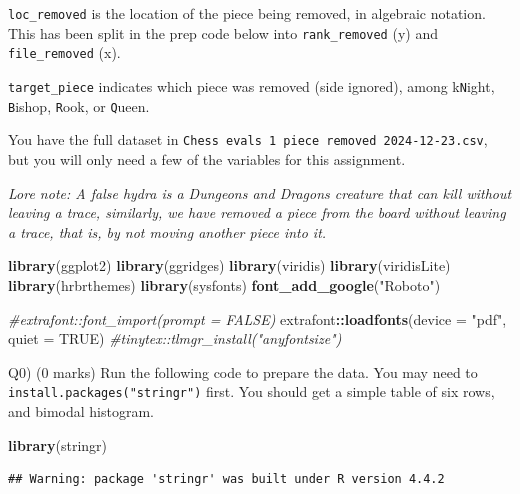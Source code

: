 \documentclass[
]{article}
\newenvironment{Shaded}{\begin{snugshade}}{\end{snugshade}}
\newcommand{\AttributeTok}[1]{\textcolor[rgb]{0.13,0.29,0.53}{#1}}
\newcommand{\CommentTok}[1]{\textcolor[rgb]{0.56,0.35,0.01}{\textit{#1}}}
\newcommand{\ConstantTok}[1]{\textcolor[rgb]{0.56,0.35,0.01}{#1}}
\newcommand{\FunctionTok}[1]{\textcolor[rgb]{0.13,0.29,0.53}{\textbf{#1}}}
\newcommand{\NormalTok}[1]{#1}
\newcommand{\SpecialCharTok}[1]{\textcolor[rgb]{0.81,0.36,0.00}{\textbf{#1}}}
\newcommand{\StringTok}[1]{\textcolor[rgb]{0.31,0.60,0.02}{#1}}
\begin{document}
\texttt{loc\_removed} is the location of the piece being removed, in
algebraic notation. This has been split in the prep code below into
\texttt{rank\_removed} (y) and \texttt{file\_removed} (x).

\texttt{target\_piece} indicates which piece was removed (side ignored),
among k\texttt{N}ight, \texttt{B}ishop, \texttt{R}ook, or
\texttt{Q}ueen.

You have the full dataset in
\texttt{Chess\ evals\ 1\ piece\ removed\ 2024-12-23.csv}, but you will
only need a few of the variables for this assignment.

\emph{Lore note: A false hydra is a Dungeons and Dragons creature that
can kill without leaving a trace, similarly, we have removed a piece
from the board without leaving a trace, that is, by not moving another
piece into it.}

\begin{Shaded}
\begin{Highlighting}[]
\FunctionTok{library}\NormalTok{(ggplot2)}
\FunctionTok{library}\NormalTok{(ggridges)}
\FunctionTok{library}\NormalTok{(viridis)}
\FunctionTok{library}\NormalTok{(viridisLite)}
\FunctionTok{library}\NormalTok{(hrbrthemes)}
\FunctionTok{library}\NormalTok{(sysfonts)}
\FunctionTok{font\_add\_google}\NormalTok{(}\StringTok{"Roboto"}\NormalTok{)}

\CommentTok{\#extrafont::font\_import(prompt = FALSE)}
\NormalTok{extrafont}\SpecialCharTok{::}\FunctionTok{loadfonts}\NormalTok{(}\AttributeTok{device =} \StringTok{"pdf"}\NormalTok{, }\AttributeTok{quiet =} \ConstantTok{TRUE}\NormalTok{)}
\CommentTok{\#tinytex::tlmgr\_install("anyfontsize")}
\end{Highlighting}
\end{Shaded}

Q0) (0 marks) Run the following code to prepare the data. You may need
to \texttt{install.packages("stringr")} first. You should get a simple
table of six rows, and bimodal histogram.

\begin{Shaded}
\begin{Highlighting}[]
\FunctionTok{library}\NormalTok{(stringr)}
\end{Highlighting}
\end{Shaded}

\begin{verbatim}
## Warning: package 'stringr' was built under R version 4.4.2
\end{verbatim}
\end{document}
